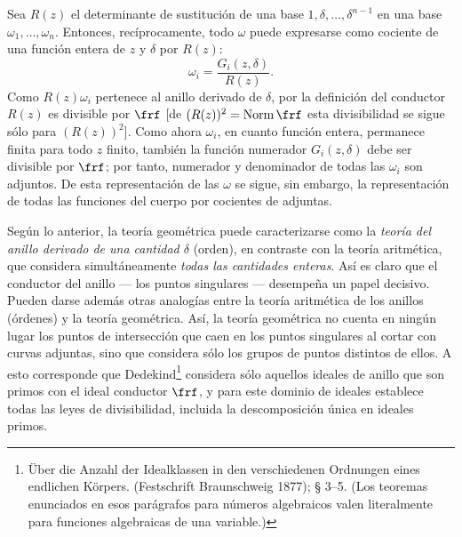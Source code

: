 \documentclass[11pt]{article}
\begin{document}
Sea \(R(z)\) el determinante de sustitución de una base \(1,\delta,\ldots,\delta^{n-1}\) en una base \(\omega_1,\ldots,\omega_n\). Entonces, recíprocamente, todo \(\omega\) puede expresarse como cociente de una función entera de \(z\) y \(\delta\) por \(R(z)\):
\[
\omega_i=\frac{G_i(z,\delta)}{R(z)}.
\]
Como \(R(z)\omega_i\) pertenece al anillo derivado de \(\delta\), por la definición del conductor \(R(z)\) es divisible por \(\frf\) [de \((R(z))^2=\operatorname{Norm}\frf\) esta divisibilidad se sigue sólo para \((R(z))^2\)]. Como ahora \(\omega_i\), en cuanto función entera, permanece finita para todo \(z\) finito, también la función numerador \(G_i(z,\delta)\) debe ser divisible por \(\frf\); por tanto, numerador y denominador de todas las \(\omega_i\) son adjuntos. De esta representación de las \(\omega\) se sigue, sin embargo, la representación de todas las funciones del cuerpo por cocientes de adjuntas.

Según lo anterior, la teoría geométrica puede caracterizarse como la \emph{teoría del anillo derivado de una cantidad \(\delta\)} (orden), en contraste con la teoría aritmética, que considera simultáneamente \emph{todas las cantidades enteras}. Así es claro que el conductor del anillo --- los puntos singulares --- desempeña un papel decisivo. Pueden darse además otras analogías entre la teoría aritmética de los anillos (órdenes) y la teoría geométrica. Así, la teoría geométrica no cuenta en ningún lugar los puntos de intersección que caen en los puntos singulares al cortar con curvas adjuntas, sino que considera sólo los grupos de puntos distintos de ellos. A esto corresponde que Dedekind\footnote{Über die Anzahl der Idealklassen in den verschiedenen Ordnungen eines endlichen Körpers. (Festschrift Braunschweig 1877); § 3--5. (Los teoremas enunciados en esos parágrafos para números algebraicos valen literalmente para funciones algebraicas de una variable.)} considera sólo aquellos ideales de anillo que son primos con el ideal conductor \(\frf\), y para este dominio de ideales establece todas las leyes de divisibilidad, incluida la descomposición única en ideales primos.
\end{document}

